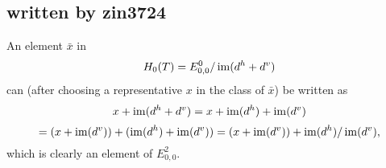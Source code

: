 \subsection{written by zin3724}
An element $\bar x$ in
\[H_0(T)=E^0_{0,0}/\im(d^h+d^v)\]
can (after choosing a representative $x$ in the class of $\bar x$) be written as
\[x+\im(d^h+d^v)=x+\im(d^h)+\im(d^v)\]
\[=(x+\im(d^v))+(\im(d^h)+\im(d^v))=(x+\im(d^v))+\im(d^h)/\im(d^v),\]
which is clearly an element of $E^2_{0,0}$.